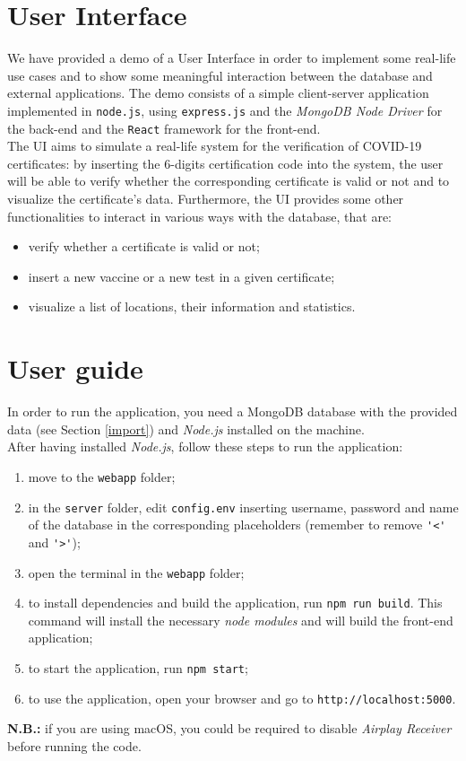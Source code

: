 \documentclass{article}
\begin{document}
\section{User Interface}
    We have provided a demo of a User Interface in order to implement some real-life use cases and to show some meaningful interaction between the database and external applications. The demo consists of a simple client-server application implemented in \verb|node.js|, using \verb|express.js| and the \textit{MongoDB Node Driver} for the back-end and the \verb|React| framework for the front-end.\\
    The UI aims to simulate a real-life system for the verification of COVID-19 certificates: by inserting the 6-digits certification code into the system, the user will be able to verify whether the corresponding certificate is valid or not and to visualize the certificate's data. Furthermore, the UI provides some other functionalities to interact in various ways with the database, that are:
    \begin{itemize}
    \item verify whether a certificate is valid or not;
    \item insert a new vaccine or a new test in a given certificate;
    \item visualize a list of locations, their information and statistics.
    \end{itemize}
\section{User guide}
In order to run the application, you need a MongoDB database with the provided data (see Section \ref{import}) and \textit{Node.js} installed on the machine.\\
After having installed \textit{Node.js}, follow these steps to run the application:
\begin{enumerate}
    \item move to the \verb|webapp| folder;
    \item in the \verb|server| folder, edit \verb|config.env| inserting username, password and name of the database in the corresponding placeholders (remember to remove \verb|'<'| and \verb|'>'|);
    \item open the terminal in the \verb|webapp| folder;
    \item to install dependencies and build the application, run \verb|npm run build|. This command will install the necessary \textit{node modules} and will build the front-end application;
    \item to start the application, run \verb|npm start|;
    \item to use the application, open your browser and go to \verb|http://localhost:5000|.
\end{enumerate}
\textbf{N.B.:} if you are using macOS, you could be required to disable \textit{Airplay Receiver} before running the code. 
\end{document}
